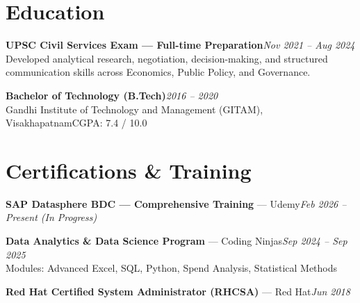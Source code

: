 \documentclass[10pt, letterpaper]{article}
\begin{document}
\section{Education}

{\bfseries UPSC Civil Services Exam — Full-time Preparation}\hfill{\small\color{muted}\textit{Nov 2021 – Aug 2024}}\\
{\small\color{muted}Developed analytical research, negotiation, decision-making, and structured communication skills across Economics, Public Policy, and Governance.}

\vspace{2pt}
{\bfseries Bachelor of Technology (B.Tech)}\hfill{\small\color{muted}\textit{2016 – 2020}}\\
{\small\color{muted}Gandhi Institute of Technology and Management (GITAM), Visakhapatnam\hfill CGPA: 7.4 / 10.0}

\section{Certifications \& Training}

{\bfseries SAP Datasphere BDC — Comprehensive Training} — Udemy\hfill{\small\color{muted}\textit{Feb 2026 – Present \emph{(In Progress)}}}

\vspace{1pt}
{\bfseries Data Analytics \& Data Science Program} — Coding Ninjas\hfill{\small\color{muted}\textit{Sep 2024 – Sep 2025}}\\
{\small\color{muted}Modules: Advanced Excel, SQL, Python, Spend Analysis, Statistical Methods}

\vspace{1pt}
{\bfseries Red Hat Certified System Administrator (RHCSA)} — Red Hat\hfill{\small\color{muted}\textit{Jun 2018}}

\end{document}
